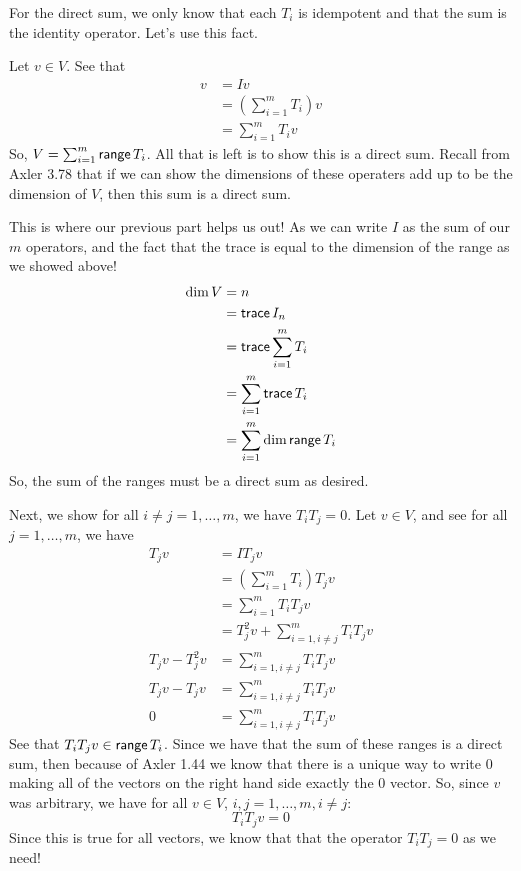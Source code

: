 \documentclass[answers]{exam}
\begin{document}
\begin{questions}
\begin{parts}
\begin{solution}
            For the direct sum, we only know that each $T_i$ is idempotent and that the sum is the identity 
            operator. Let's use this fact.

            Let $v\in V$. See that
            \begin{align*}
                v &= Iv \\
                &= \left(\sum_{i=1}^mT_i\right)v \\
                &= \sum_{i=1}^mT_iv
            \end{align*}
            So, $V = \sum_{i=1}^m\mathsf{range}\,{T_i}$. All that is left is to show this is a direct sum. Recall from 
            Axler 3.78 that if we can show the dimensions of these operaters add up to be the dimension of $V$,
            then this sum is a direct sum.

            This is where our previous part helps us out! As we can write $I$ as the sum of our $m$ operators, and
            the fact that the trace is equal to the dimension of the range as we showed above!
            \begin{align*}
                \text{dim}\,{V} &= n \\
                        &= \mathsf{trace}\,{I_n} \\
                        &= \mathsf{trace}\,{\sum_{i=1}^mT_i} \\
                        &= \sum_{i=1}^m\mathsf{trace}\,{T_i} \\
                        &= \sum_{i=1}^m\text{dim}\,{\mathsf{range}\,{{T_i}}}
            \end{align*}
            So, the sum of the ranges must be a direct sum as desired.

            Next, we show for all $i\neq j=1,\dots,m$, we have $T_iT_j = 0$.
            Let $v\in V$, and see for all $j=1,\dots,m$, we have
            \begin{align*}
                T_jv &= IT_jv \\
                     &= \left(\sum_{i=1}^mT_i\right)T_jv \\
                     &= \sum_{i=1}^mT_iT_jv \\
                     &= T_j^2v + \sum_{i=1,i\neq j}^mT_iT_jv \\
                T_jv - T_j^2v &= \sum_{i=1,i\neq j}^mT_iT_jv\\
                T_jv - T_jv &= \sum_{i=1,i\neq j}^mT_iT_jv\\
                0 &= \sum_{i=1,i\neq j}^mT_iT_jv
            \end{align*}
            See that $T_iT_jv\in\mathsf{range}\,{T_i}$. Since we have that the sum of these ranges is a direct sum, then
            because of Axler 1.44 we know that there is a unique way to write $0$ making all of the vectors
            on the right hand side exactly the $0$ vector. So, since $v$ was arbitrary, we have for all $v\in V$,
            $i,j=1,\dots,m,i\neq j$:
            \[
                T_iT_jv = 0
            \]
            Since this is true for all vectors, we know that that the operator $T_iT_j = 0$ as we need!


\end{solution}
\end{parts}
\end{questions}
\end{document}
